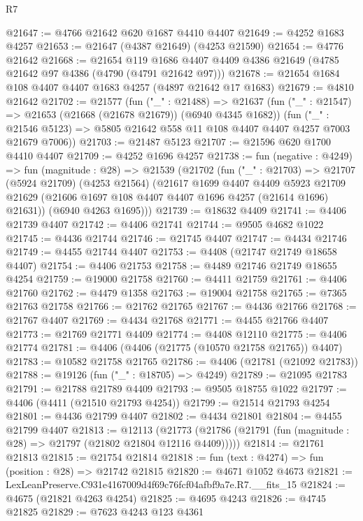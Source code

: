 \begin{lexlean}{R7}
\begin{coremodule}
@21647 := @4766 @21642 @620 @1687 @4410 @4407
@21649 := @4252 @1683 @4257
@21653 := @21647 (@4387 @21649) (@4253 @21590)
@21654 := @4776 @21642
@21668 := @21654
    @119
    @1686
    @4407
    @4409
    @4386
    @21649
    (@4785 @21642 @97 @4386 (@4790 (@4791 @21642 @97)))
@21678 := @21654 @1684 @108 @4407 @4407 @1683 @4257 (@4897 @21642 @17 @1683)
@21679 := @4810 @21642
@21702 := @21577
    (fun ("_" : @21488) =>
    @21637
      (fun ("_" : @21547) => @21653 (@21668 (@21678 @21679)) (@6940 @4345 @1682))
      (fun ("_" : @21546 @5123) => @5805 @21642 @558 @11 @108 @4407 @4407 @4257 @7003 @21679 @7006))
@21703 := @21487 @5123
@21707 := @21596 @620 @1700 @4410 @4407
@21709 := @4252 @1696 @4257
@21738 := fun (negative : @4249) =>
  fun (magnitude : @28) =>
  @21539
    (@21702
      (fun ("_" : @21703) =>
      @21707
        (@5924 @21709)
        (@4253 @21564)
        (@21617
          @1699
          @4407
          @4409
          @5923
          @21709
          @21629
          (@21606 @1697 @108 @4407 @4407 @1696 @4257 (@21614 @1696) @21631))
        (@6940 @4263 @1695)))
@21739 := @18632 @4409
@21741 := @4406 @21739 @4407
@21742 := @4406 @21741
@21744 := @9505 @4682 @1022
@21745 := @4436 @21744
@21746 := @21745 @4407
@21747 := @4434 @21746
@21749 := @4455 @21744 @4407
@21753 := @4408 (@21747 @21749 @18658 @4407)
@21754 := @4406 @21753
@21758 := @4489 @21746 @21749 @18655 @4254
@21759 := @19000 @21758
@21760 := @4411 @21759
@21761 := @4406 @21760
@21762 := @4479 @1358
@21763 := @19004 @21758
@21765 := @7365 @21763 @21758
@21766 := @21762 @21765
@21767 := @4436 @21766
@21768 := @21767 @4407
@21769 := @4434 @21768
@21771 := @4455 @21766 @4407
@21773 := @21769 @21771 @4409
@21774 := @4408 @12110
@21775 := @4406 @21774
@21781 := @4406 (@4406 (@21775 (@10570 @21758 @21765)) @4407)
@21783 := @10582 @21758 @21765
@21786 := @4406 (@21781 (@21092 @21783))
@21788 := @19126 (fun ("_" : @18705) => @4249)
@21789 := @21095 @21783
@21791 := @21788 @21789 @4409
@21793 := @9505 @18755 @1022
@21797 := @4406 (@4411 (@21510 @21793 @4254))
@21799 := @21514 @21793 @4254
@21801 := @4436 @21799 @4407
@21802 := @4434 @21801
@21804 := @4455 @21799 @4407
@21813 := @12113
    (@21773 (@21786 (@21791 (fun (magnitude : @28) => @21797 (@21802 @21804 @12116 @4409)))))
@21814 := @21761 @21813
@21815 := @21754 @21814
@21818 := fun (text : @4274) => fun (position : @28) => @21742 @21815
@21820 := @4671 @1052 @4673
@21821 := LexLeanPreserve.C931e4167009d4f69c76fcf04afbf9a7e.R7.__fits_15
@21824 := @4675 (@21821 @4263 @4254)
@21825 := @4695 @4243
@21826 := @4745 @21825
@21829 := @7623 @4243 @123 @4361

\end{coremodule}
\end{lexlean}
